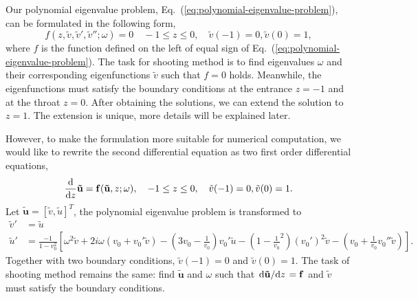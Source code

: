 Our polynomial eigenvalue problem, Eq.~(\ref{eq:polynomial-eigenvalue-problem}), can be formulated in the following form,
\begin{equation}
	f(z, \tilde{v}, \tilde{v}', \tilde{v}''; \omega) = 0
	\quad
	-1\leq z \leq 0,
	\quad
	\tilde{v}(-1) = 0, \tilde{v}(0) = 1,
\end{equation}
where $f$ is the function defined on the left of equal sign of Eq.~(\ref{eq:polynomial-eigenvalue-problem}). The task for shooting method is to find eigenvalues $\omega$ and their corresponding eigenfunctions $\tilde{v}$ such that $f=0$ holds. Meanwhile, the eigenfunctions must satisfy the boundary conditions at the entrance $z=-1$ and at the throat $z=0$. After obtaining the solutions, we can extend the solution to $z=1$. The extension is unique, more details will be explained later.

However, to make the formulation more suitable for numerical computation, we would like to rewrite the second differential equation as two first order differential equations,
\begin{equation}
	\dv{z}\mathbf{\tilde{u}} = \mathbf{f}(\mathbf{\tilde{u}},z;\omega),
	\quad
	-1 \leq z \leq 0,
	\quad
	\tilde{v}(-1) = 0, \tilde{v}(0) = 1.
	\label{eq:shooting-method-formulation}
\end{equation}
Let $\mathbf{\tilde{u}} = [\tilde{v}, \tilde{u}]^T$, the polynomial eigenvalue problem is transformed to
\begin{align*}
	\tilde{v}' & = \tilde{u}                \\
	\tilde{u}' & = \frac{-1}{1-v_0^2}\left[
		\omega^2\tilde{v} + 2i\omega(v_0+v_0'\tilde{v}) - \left(3v_0 - \frac{1}{v_0}\right)v_0'\tilde{u} - \left(1-\frac{1}{v_0}^2\right)(v_0')^2\tilde{v} - \left(v_0+\frac{1}{v_0}v_0''\tilde{v}\right)
		\right].
\end{align*}
Together with two boundary conditions, $\tilde{v}(-1) = 0$ and $\tilde{v}(0) = 1$. The task of shooting method remains the same: find $\mathbf{\tilde{u}}$ and $\omega$ such that $\dv*{\mathbf{\tilde{u}}}{z} = \mathbf{f}$ and $\tilde{v}$ must satisfy the boundary conditions.

